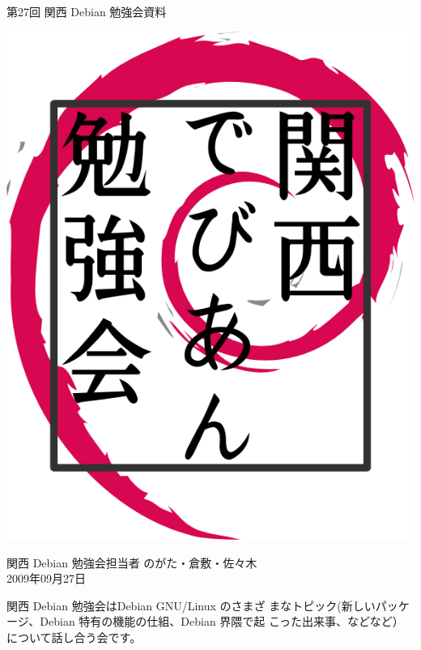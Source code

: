 \documentclass[mingoth,a4paper]{jsarticle}
\newcommand{\debmtgyear}{2009}
\newcommand{\debmtgdate}{27}
\newcommand{\debmtgmonth}{09}
\newcommand{\debmtgnumber}{27}
\begin{document}
\begin{titlepage}


 第\debmtgnumber{}回 関西 Debian 勉強会資料

\vspace{2cm}

\begin{center}
\includegraphics{image200802/kansaidebianlogo.png}
\end{center}

\begin{flushright}
\hfill{}関西 Debian 勉強会担当者 のがた・倉敷・佐々木\\
\hfill{}\debmtgyear{}年\debmtgmonth{}月\debmtgdate{}日
\end{flushright}

\thispagestyle{empty}
\end{titlepage}

 
 関西 Debian 勉強会はDebian GNU/Linux のさまざ
 まなトピック(新しいパッケージ、Debian 特有の機能の仕組、Debian 界隈で起
 こった出来事、などなど）について話し合う会です。
\end{document}

